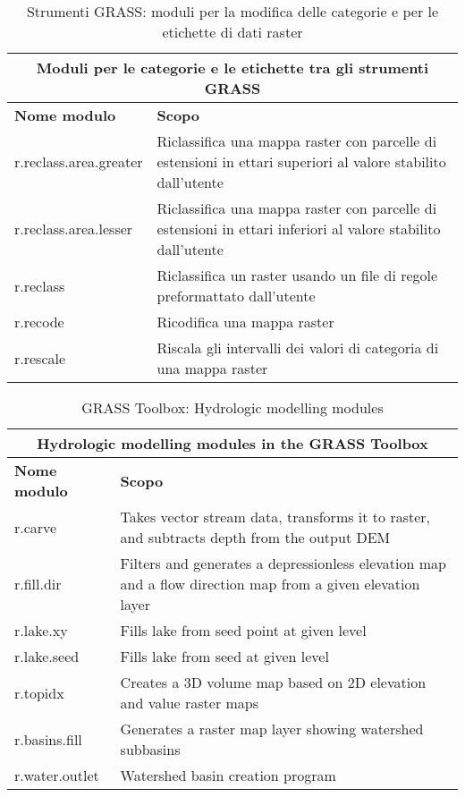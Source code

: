 \begin{table}[ht]
\centering
\caption{Strumenti GRASS: moduli per la modifica delle categorie e per le etichette di dati raster}\medskip
 \begin{tabular}{|p{4cm}|p{12cm}|}
  \hline \multicolumn{2}{|c|}{\textbf{Moduli per le categorie e le etichette tra gli strumenti GRASS}} \\
  \hline \textbf{Nome modulo} & \textbf{Scopo} \\
  \hline r.reclass.area.greater & Riclassifica una mappa raster con parcelle di estensioni in ettari superiori al valore stabilito dall'utente \\
  \hline r.reclass.area.lesser &  Riclassifica una mappa raster con parcelle di estensioni in ettari inferiori al valore stabilito dall'utente \\
  \hline r.reclass & Riclassifica un raster usando un file di regole preformattato dall'utente \\
  \hline r.recode & Ricodifica una mappa raster \\
  \hline r.rescale & Riscala gli intervalli dei valori di categoria di una mappa raster \\
\hline
\end{tabular}
\end{table}

\begin{table}[ht]
\centering
\caption{GRASS Toolbox: Hydrologic modelling modules}\medskip
 \begin{tabular}{|p{4cm}|p{12cm}|}
  \hline \multicolumn{2}{|c|}{\textbf{Hydrologic modelling modules in the GRASS
  Toolbox}} \\
  \hline \textbf{Nome modulo} & \textbf{Scopo} \\
  \hline r.carve & Takes vector stream data, transforms it to raster, and
  subtracts depth from the output DEM \\
  \hline r.fill.dir & Filters and generates a depressionless elevation map
  and a flow direction map from a given elevation layer \\
  \hline r.lake.xy & Fills lake from seed point at given level \\
  \hline r.lake.seed & Fills lake from seed at given level \\
  \hline r.topidx & Creates a 3D volume map based on 2D elevation and value
  raster maps \\
  \hline r.basins.fill & Generates a raster map layer showing watershed
  subbasins \\
  \hline r.water.outlet & Watershed basin creation program \\
\hline
\end{tabular}
\end{table}

